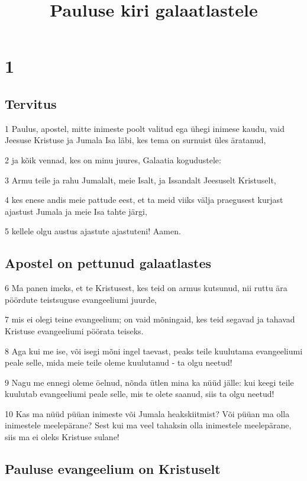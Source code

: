 

\title{Pauluse kiri galaatlastele}

\chapter{1}

\section*{Tervitus}

\par 1 Paulus, apostel, mitte inimeste poolt valitud ega ühegi inimese kaudu, vaid Jeesuse Kristuse ja Jumala Isa läbi, kes tema on surnuist üles äratanud,
\par 2 ja kõik vennad, kes on minu juures, Galaatia kogudustele:
\par 3 Armu teile ja rahu Jumalalt, meie Isalt, ja Issandalt Jeesuselt Kristuselt,
\par 4 kes enese andis meie pattude eest, et ta meid viiks välja praegusest kurjast ajastust Jumala ja meie Isa tahte järgi,
\par 5 kellele olgu austus ajastute ajastuteni! Aamen.

\section*{Apostel on pettunud galaatlastes}

\par 6 Ma panen imeks, et te Kristusest, kes teid on armus kutsunud, nii ruttu ära pöördute teistsuguse evangeeliumi juurde,
\par 7 mis ei olegi teine evangeelium; on vaid mõningaid, kes teid segavad ja tahavad Kristuse evangeeliumi pöörata teiseks.
\par 8 Aga kui me ise, või isegi mõni ingel taevast, peaks teile kuulutama evangeeliumi peale selle, mida meie teile oleme kuulutanud - ta olgu neetud!
\par 9 Nagu me ennegi oleme öelnud, nõnda ütlen mina ka nüüd jälle: kui keegi teile kuulutab evangeeliumi peale selle, mis te olete saanud, siis ta olgu neetud!
\par 10 Kas ma nüüd püüan inimeste või Jumala heakskiitmist? Või püüan ma olla inimestele meelepärane? Sest kui ma veel tahaksin olla inimestele meelepärane, siis ma ei oleks Kristuse sulane!

\section*{Pauluse evangeelium on Kristuselt}

